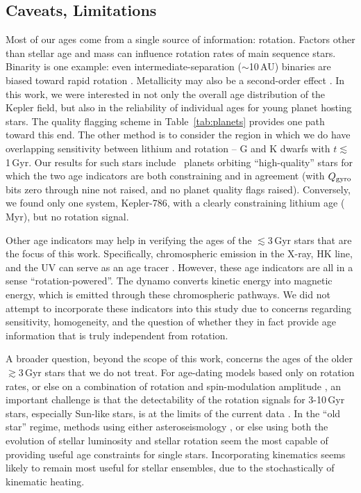 \documentclass[11pt,twocolumn,tighten]{aastex63}
\begin{document}
\subsection{Caveats, Limitations}

Most of our ages come from a single source of information: rotation.
Factors other than stellar age and mass can influence rotation rates of main sequence stars.
Binarity is one example: even intermediate-separation ($\sim$10\,AU) binaries are biased
toward rapid rotation
\citep[e.g.][and many studies thereafter]{Meibom_2007}. %
Metallicity may also be a second-order effect
\citep{2020MNRAS.499.3481A,2024arXiv240500779S}.
In this work, we were interested in not only the overall
age distribution of the Kepler field, but also in the reliability of individual ages for
young planet hosting stars.
The quality flagging scheme in Table~\ref{tab:planets} provides one path toward this end.
The other method is to consider the region in which we do have
overlapping sensitivity between lithium and rotation -- 
G and K dwarfs with $t$$\lesssim$1\,Gyr.  
Our results for such stars include
\ltonegyrhighqconfirmedtwosided\ planets orbiting ``high-quality''
stars for which the two age indicators are both constraining and in agreement
(with $Q_{\rm gyro}$ bits zero through nine not raised, and no planet quality flags raised).
Conversely, we found only one system, Kepler-786, with a clearly
constraining lithium age (\kepseveneightsix\,Myr), but no rotation signal.

Other age indicators may help in verifying the ages of
the $\lesssim$3\,Gyr stars that are the focus of this work.
Specifically, chromospheric emission in the
X-ray,  HK line, and the UV can serve as an age tracer
\citep{Mamajek_2008,2014MNRAS.441.2361V,2024ApJ...960...62E}.
However, these age indicators are all in a sense ``rotation-powered''.  The dynamo
converts kinetic energy into magnetic energy, which is emitted through these chromospheric
pathways.
We did not attempt to incorporate these indicators into this study
due to concerns regarding sensitivity, homogeneity, and
the question of whether they in fact provide age
information that is truly independent from rotation.

A broader question, beyond the scope of this work, concerns the ages of
the older $\gtrsim$3\,Gyr stars that we do not treat.
For age-dating models based only on rotation rates, or else
on a combination of rotation and spin-modulation amplitude
\citep{2023ApJ...952..131M}, an important challenge is that the detectability
of the rotation signals for 3-10\,Gyr stars, especially Sun-like stars,
is at the limits of the current data \citep{2022ApJ...937...94M}.
In the ``old star'' regime, methods 
using either asteroseismology
\citep{vanSaders_2016,2024ApJ...962..138S}, or else
using both the evolution of
stellar luminosity and stellar rotation \citep{Angus_2019} seem the most
capable of providing useful age constraints for single stars.
Incorporating kinematics \citep{2021AJ....161..189L} seems likely to remain
most useful for stellar ensembles, due to the stochastically of kinematic heating.
\end{document}
